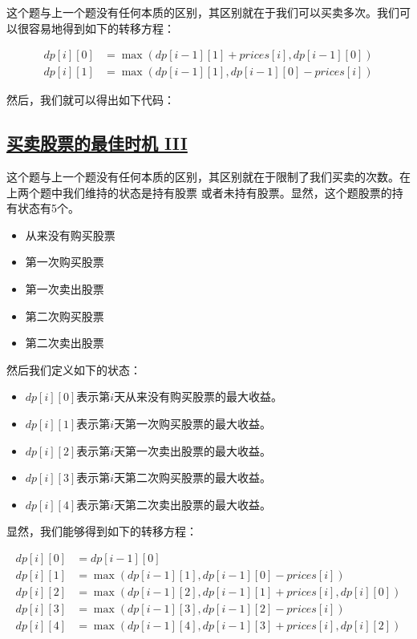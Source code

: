 \documentclass[../../main.tex]{subfiles}
\begin{document}
这个题与上一个题没有任何本质的区别，其区别就在于我们可以买卖多次。我们可以很容易地得到如下的转移方程：

\begin{align*}
  dp[i][0] &= \max(dp[i - 1][1] + prices[i], dp[i - 1][0]) \\
  dp[i][1] &= \max(dp[i - 1][1], dp[i - 1][0] - prices[i])
\end{align*}

然后，我们就可以得出如下代码：



\subsection{\href{https://leetcode-cn.com/problems/best-time-to-buy-and-sell-stock-iii/}{买卖股票的最佳时机 III}}

这个题与上一个题没有任何本质的区别，其区别就在于限制了我们买卖的次数。在上两个题中我们维持的状态是持有股票
或者未持有股票。显然，这个题股票的持有状态有5个。

\begin{itemize}
  \item 从来没有购买股票
  \item 第一次购买股票
  \item 第一次卖出股票
  \item 第二次购买股票
  \item 第二次卖出股票
\end{itemize}

然后我们定义如下的状态：

\begin{itemize}
  \item $dp[i][0]$表示第$i$天从来没有购买股票的最大收益。
  \item $dp[i][1]$表示第$i$天第一次购买股票的最大收益。
  \item $dp[i][2]$表示第$i$天第一次卖出股票的最大收益。
  \item $dp[i][3]$表示第$i$天第二次购买股票的最大收益。
  \item $dp[i][4]$表示第$i$天第二次卖出股票的最大收益。
\end{itemize}

显然，我们能够得到如下的转移方程：

\begin{align*}
  dp[i][0] &= dp[i - 1][0] \\
  dp[i][1] &= \max(dp[i - 1][1], dp[i - 1][0] - prices[i]) \\
  dp[i][2] &= \max(dp[i - 1][2], dp[i - 1][1] + prices[i], dp[i][0]) \\
  dp[i][3] &= \max(dp[i - 1][3], dp[i - 1][2] - prices[i]) \\
  dp[i][4] &= \max(dp[i - 1][4], dp[i - 1][3] + prices[i], dp[i][2]) \\
\end{align*}
\end{document}
